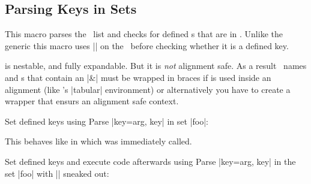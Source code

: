\subsection{Parsing Keys in Sets}\label{sec:expkv:set}

\begin{function}{\ekvset}
  \begin{syntax}
    \kvarg
  \end{syntax}
  This macro parses the \kv\ list and checks for defined \key{}s that are in
  \set. Unlike the generic  this macro uses |\detokenize| on the
  \key\ before checking whether it is a defined key.

   is nestable, and fully expandable. But it is \emph{not} alignment
  safe. As a result \key\ names and \val{}s that contain an |&| must be wrapped
  in braces if  is used inside an alignment (like \LaTeXe's |tabular|
  environment) or alternatively you have to create a wrapper that ensurs an
  alignment safe context.
\end{function}
\begin{example}{Set defined keys using }
  Parse |key=arg, key| in set |foo|:
  \begin{enverb}[no-tcb]
  \end{enverb}
\end{example}

\begin{function}{\ekvsetSneaked}
  \begin{syntax}
    \kvarg
  \end{syntax}
  This behaves like  in which  was immediately called.
\end{function}
\begin{example}
    {Set defined keys and execute code afterwards using
    }
  Parse |key=arg, key| in the set |foo| with |\afterwards| sneaked out:
  \begin{enverb}[no-tcb]
  \end{enverb}
\end{example}

